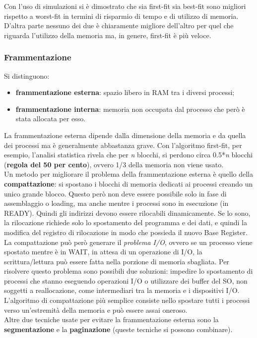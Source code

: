 \documentclass{article}
\begin{document}
				Con l’uso di simulazioni si è dimostrato che sia first-fit sia best-fit sono migliori rispetto a worst-fit in termini di risparmio di tempo e di utilizzo di memoria. D’altra parte nessuno dei due è chiaramente migliore dell’altro per quel che riguarda l’utilizzo della memoria ma, in genere, first-fit è più veloce.

			\subsubsection{Frammentazione}
				Si distinguono:
				\begin{itemize}
					\item \textbf{frammentazione esterna}: spazio libero in RAM tra i diversi processi;
					\item \textbf{frammentazione interna}: memoria non occupata dal processo che però è stata allocata per esso.
				\end{itemize}
				La frammentazione esterna dipende dalla dimensione della memoria e da quella dei processi ma è generalmente abbastanza grave. Con l'algoritmo first-fit, per esempio, l'analisi statistica rivela che per \textit{n} blocchi, si perdono circa 0.5*\textit{n} blocchi (\textbf{regola del 50 per cento}), ovvero 1/3 della memoria non viene usato.
				\\Un metodo per migliorare il problema della frammentazione esterna è quello della \textbf{compattazione}: si spostano i blocchi di memoria dedicati ai processi creando un unico grande blocco. Questo però non deve essere possibile solo in fase di assemblaggio o loading, ma anche mentre i processi sono in esecuzione (in READY). Quindi gli indirizzi devono essere rilocabili dinamicamente. Se lo sono, la rilocazione richiede solo lo spostamento del programma e dei dati, e quindi la modifica del registro di rilocazione in modo che possieda il nuovo Base Register. La compattazione può però generare il \textit{problema I/O}, ovvero se un processo viene spostato mentre è in WAIT, in attesa di un operazione di I/O, la scrittura/lettura può essere fatta nella porzione di memoria sbagliata. Per risolvere questo problema sono possibili due soluzioni: impedire lo spostamento di processi che stanno eseguendo operazioni I/O o utilizzare dei buffer del SO, non soggetti a reallocazione, come intermediari tra la memoria e i dispositivi I/O.
				\\L'algoritmo di compattazione più semplice consiste nello spostare tutti i processi verso un'estremità della memoria e può essere assai oneroso. 
				\\Altre due tecniche usate per evitare la frammentazione esterna sono la \textbf{segmentazione} e la \textbf{paginazione} (queste tecniche si possono combinare).
\end{document}
